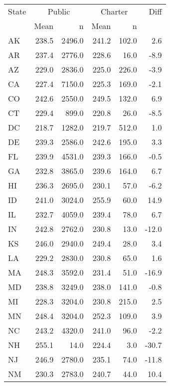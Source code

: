 \begin{table}[ht]
\begin{center}
\begin{tabular}{lrr@{\extracolsep{10pt}}rr@{\extracolsep{10pt}}r}
  \hline
  State & \multicolumn{2}{c}{Public} & \multicolumn{2}{c}{Charter} & Diff \\ \cline{2-3} \cline{4-5} & Mean & n & Mean & n & \\ \hline
AK & 238.5 & 2496.0 & 241.2 & 102.0 & 2.6 \\ 
  AR & 237.4 & 2776.0 & 228.6 & 16.0 & -8.9 \\ 
  AZ & 229.0 & 2836.0 & 225.0 & 226.0 & -3.9 \\ 
  CA & 227.4 & 7150.0 & 225.3 & 169.0 & -2.1 \\ 
  CO & 242.6 & 2550.0 & 249.5 & 132.0 & 6.9 \\ 
  CT & 229.4 & 899.0 & 220.8 & 26.0 & -8.5 \\ 
  DC & 218.7 & 1282.0 & 219.7 & 512.0 & 1.0 \\ 
  DE & 239.3 & 2586.0 & 242.6 & 195.0 & 3.3 \\ 
  FL & 239.9 & 4531.0 & 239.3 & 166.0 & -0.5 \\ 
  GA & 232.8 & 3865.0 & 239.6 & 164.0 & 6.7 \\ 
  HI & 236.3 & 2695.0 & 230.1 & 57.0 & -6.2 \\ 
  ID & 241.0 & 3024.0 & 255.9 & 60.0 & 14.9 \\ 
  IL & 232.7 & 4059.0 & 239.4 & 78.0 & 6.7 \\ 
  IN & 242.8 & 2762.0 & 230.8 & 13.0 & -12.0 \\ 
  KS & 246.0 & 2940.0 & 249.4 & 28.0 & 3.4 \\ 
  LA & 229.2 & 2830.0 & 230.8 & 65.0 & 1.6 \\ 
  MA & 248.3 & 3592.0 & 231.4 & 51.0 & -16.9 \\ 
  MD & 238.8 & 3249.0 & 238.0 & 141.0 & -0.8 \\ 
  MI & 228.3 & 3204.0 & 230.8 & 215.0 & 2.5 \\ 
  MN & 248.4 & 3204.0 & 252.3 & 109.0 & 3.9 \\ 
  NC & 243.2 & 4320.0 & 241.0 & 96.0 & -2.2 \\ 
  NH & 255.1 & 14.0 & 224.4 & 3.0 & -30.7 \\ 
  NJ & 246.9 & 2780.0 & 235.1 & 74.0 & -11.8 \\ 
  NM & 230.3 & 2783.0 & 240.7 & 44.0 & 10.4 \\ 

\end{tabular}
\end{center}
\end{table}
